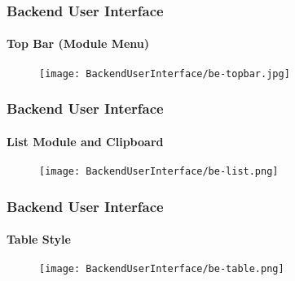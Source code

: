 
\begin{frame}[fragile]
	\frametitle{Backend User Interface}
	\framesubtitle{Top Bar (Module Menu)}

	\begin{figure}
		\texttt{[image: BackendUserInterface/be-topbar.jpg]}
	\end{figure}

\end{frame}


\begin{frame}[fragile]
	\frametitle{Backend User Interface}
	\framesubtitle{List Module and Clipboard}

	\begin{figure}
		\texttt{[image: BackendUserInterface/be-list.png]}
	\end{figure}

\end{frame}


\begin{frame}[fragile]
	\frametitle{Backend User Interface}
	\framesubtitle{Table Style}

	\begin{figure}
		\texttt{[image: BackendUserInterface/be-table.png]}
	\end{figure}

\end{frame}


